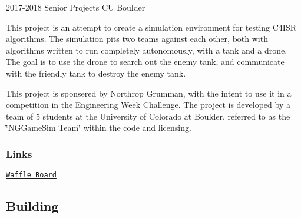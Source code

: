 2017-\/2018 Senior Projects CU Boulder

This project is an attempt to create a simulation environment for testing C4\+I\+SR algorithms. The simulation pits two teams against each other, both with algorithms written to run completely autonomously, with a tank and a drone. The goal is to use the drone to search out the enemy tank, and communicate with the friendly tank to destroy the enemy tank.

This project is sponsered by Northrop Grumman, with the intent to use it in a competition in the Engineering Week Challenge. The project is developed by a team of 5 students at the University of Colorado at Boulder, referred to as the \char`\"{}\+N\+G\+Game\+Sim Team\char`\"{} within the code and licensing.

\subsubsection*{Links}


\begin{DoxyItemize}
\item \href{https://waffle.io/NGGameSim/NGGameSim}{\tt Waffle Board}
\end{DoxyItemize}

\subsection*{Building}

